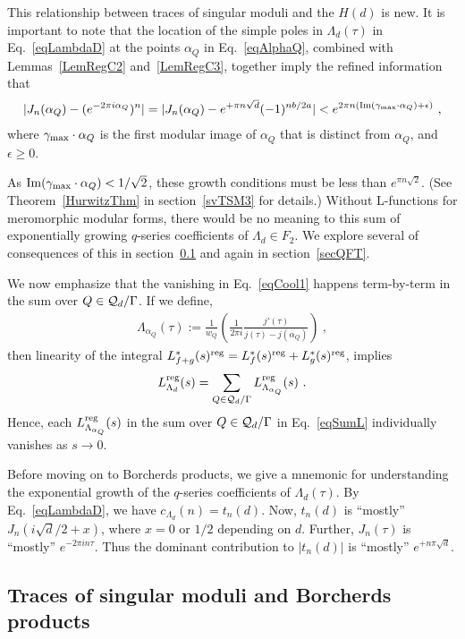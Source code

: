 \documentclass[11pt,a4paper]{article}
\newcommand{\g}{\gamma}
\newcommand{\e}{\epsilon}
\newcommand{\G}{\Gamma}
\newcommand{\La}{\Lambda}
\newcommand{\reg}{{\rm reg}}
\begin{document}
This relationship between traces of singular moduli and the $H(d)$ is new. It is important to note that the location of the simple poles in $\Lambda_d(\tau)$ in Eq.~\eqref{eqLambdaD} at the points $\alpha_Q$ in Eq.~\eqref{eqAlphaQ}, combined with Lemmas~\ref{LemRegC2} and~\ref{LemRegC3}, together imply the refined information that
\begin{align}
|J_n(\alpha_Q) - (e^{-2 \pi i \alpha_Q})^n| = |J_n(\alpha_Q) - e^{+\pi n \sqrt{d}}(-1)^{n b/2a}| < e^{2 \pi n({\rm Im} (\g_{\rm max} \cdot \alpha_Q)+\e)}~, \label{eqJdBound}
\end{align} 
where $\g_{\rm max} \cdot \alpha_Q$ is the first modular image of $\alpha_Q$ that is distinct from $\alpha_Q$, and  $\e \geq0 $. 

As ${\rm Im}(\g_{\rm max} \cdot \alpha_Q) < 1/\sqrt{2}$, these growth conditions must be less than $e^{\pi n \sqrt{2}}$. (See Theorem~\ref{HurwitzThm} in section~\ref{svTSM3} for details.) Without L-functions for meromorphic modular forms, there would be no meaning to this sum of exponentially growing $q$-series coefficients of $\Lambda_d \in F_2$. We explore several of consequences of this in section~\ref{svTSM2} and again in section~\ref{secQFT}.

We now emphasize that the vanishing in Eq.~\eqref{eqCool1} happens term-by-term in the sum over $Q \in {\cal Q}_d/\G$. If we define,
\begin{align}
\La_{\alpha_Q}(\tau):= \frac{1}{w_Q} \left(\frac{1}{2\pi i} \frac{j'(\tau)}{j(\tau) - j(\alpha_Q)}\right)~,
\end{align}
then linearity of the integral $L_{f+g}^*(s)^\reg = L_{f}^*(s)^\reg + L_{g}^*(s)^\reg$, implies
\begin{align}
L_{\Lambda_d}^\reg(s) = \sum_{Q \in {\cal Q}_d/\G} L_{\Lambda_{\alpha_Q}}^{\reg}(s)~. \label{eqSumL}
\end{align}
Hence, each $L_{\La_{\alpha_Q}}^\reg(s)$ in the sum over $Q \in {\cal Q}_d/\G$ in Eq.~\eqref{eqSumL} individually vanishes as $s \to 0$.

Before moving on to Borcherds products, we give a mnemonic for understanding the exponential growth of the $q$-series coefficients of $\La_d(\tau)$. By Eq.~\eqref{eqLambdaD}, we have $c_{\La_d}(n) = t_n(d)$. Now, $t_n(d)$ is ``mostly'' $J_n(i \sqrt{d}/2+x)$, where $x = 0$ or $1/2$ depending on $d$. Further, $J_n(\tau)$ is ``mostly'' $e^{-2 \pi i n \tau}$. Thus the dominant contribution to $|t_n(d)|$ is ``mostly'' $e^{+n \pi \sqrt{d}}$.

\subsection{Traces of singular moduli and Borcherds products}\label{svTSM2}
\end{document}
